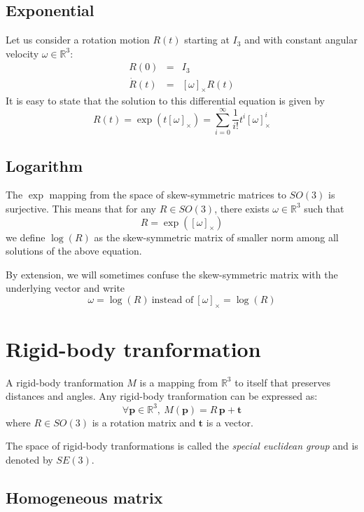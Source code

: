 \documentclass{article}
\newcommand\vect[1]{\mathbf{#1}}
\newcommand\reals{\mathbb{R}}
\newcommand\trans{\mathbf{t}}
\begin{document}
\subsection{Exponential}

Let us consider a rotation motion $R(t)$ starting at $I_3$ and with constant angular velocity $\omega\in\reals^3$:
\begin{eqnarray*}
  R(0) &=& I_3\\
  \dot{R}(t) &=& \left[\omega\right]_{\times} R(t)
\end{eqnarray*}
It is easy to state that the solution to this differential equation is given by
$$
R(t) = \exp(t \left[\omega\right]_{\times}) = \sum_{i=0}^{\infty}\frac{1}{i!}t^i \left[\omega\right]_{\times}^i
$$

\subsection{Logarithm}

The $\exp$ mapping from the space of skew-symmetric matrices to $SO(3)$ is surjective. This means that for any $R\in SO(3)$, there exists $\omega\in\reals^3$ such that
$$
R = \exp(\left[\omega\right]_{\times})
$$
we define $\log(R)$ as the skew-symmetric matrix of smaller norm among all solutions of the above equation.

By extension, we will sometimes confuse the skew-symmetric matrix with the underlying vector and write
$$
\omega = \log(R)\ \mbox{instead of}\ \left[\omega\right]_{\times} = \log(R)
$$

\section{Rigid-body tranformation}

A rigid-body tranformation $M$ is a mapping from $\reals^3$ to itself that preserves distances and angles. Any rigid-body tranformation can be expressed as:
$$
\forall \vect{p}\in\reals^3,\ M(\vect{p}) = R\,\vect{p} + \trans
$$
where $R\in SO(3)$ is a rotation matrix and $\trans$ is a vector.

The space of rigid-body tranformations is called the \textit{special euclidean group} and is denoted by $SE(3)$.

\subsection{Homogeneous matrix}
\end{document}
